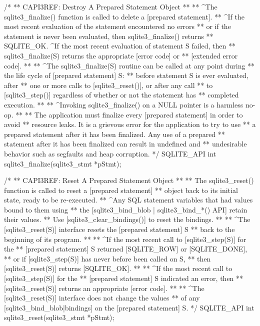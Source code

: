 \begin{Codex}[label=sqlite3.h,numbers=left]
{/*
** CAPI3REF: Destroy A Prepared Statement Object
**
** ^The sqlite3_finalize() function is called to delete a [prepared statement].
** ^If the most recent evaluation of the statement encountered no errors
** or if the statement is never been evaluated, then sqlite3_finalize() returns
** SQLITE_OK.  ^If the most recent evaluation of statement S failed, then
** sqlite3_finalize(S) returns the appropriate [error code] or
** [extended error code].
**
** ^The sqlite3_finalize(S) routine can be called at any point during
** the life cycle of [prepared statement] S:
** before statement S is ever evaluated, after
** one or more calls to [sqlite3_reset()], or after any call
** to [sqlite3_step()] regardless of whether or not the statement has
** completed execution.
**
** ^Invoking sqlite3_finalize() on a NULL pointer is a harmless no-op.
**
** The application must finalize every [prepared statement] in order to avoid
** resource leaks.  It is a grievous error for the application to try to use
** a prepared statement after it has been finalized.  Any use of a prepared
** statement after it has been finalized can result in undefined and
** undesirable behavior such as segfaults and heap corruption.
*/
SQLITE_API int sqlite3_finalize(sqlite3_stmt *pStmt);

/*
** CAPI3REF: Reset A Prepared Statement Object
**
** The sqlite3_reset() function is called to reset a [prepared statement]
** object back to its initial state, ready to be re-executed.
** ^Any SQL statement variables that had values bound to them using
** the [sqlite3_bind_blob | sqlite3_bind_*() API] retain their values.
** Use [sqlite3_clear_bindings()] to reset the bindings.
**
** ^The [sqlite3_reset(S)] interface resets the [prepared statement] S
** back to the beginning of its program.
**
** ^If the most recent call to [sqlite3_step(S)] for the
** [prepared statement] S returned [SQLITE_ROW] or [SQLITE_DONE],
** or if [sqlite3_step(S)] has never before been called on S,
** then [sqlite3_reset(S)] returns [SQLITE_OK].
**
** ^If the most recent call to [sqlite3_step(S)] for the
** [prepared statement] S indicated an error, then
** [sqlite3_reset(S)] returns an appropriate [error code].
**
** ^The [sqlite3_reset(S)] interface does not change the values
** of any [sqlite3_bind_blob|bindings] on the [prepared statement] S.
*/
SQLITE_API int sqlite3_reset(sqlite3_stmt *pStmt);

}
\end{Codex}
